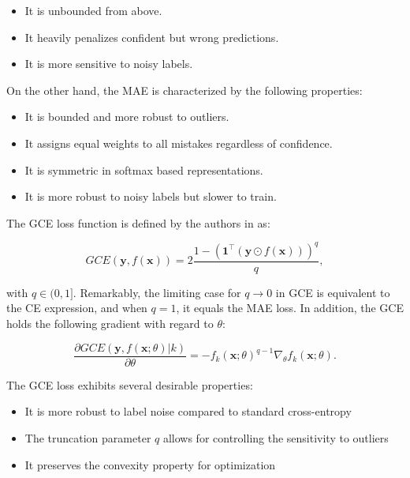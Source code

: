 \begin{itemize}
  \item It is unbounded from above.
  \item It heavily penalizes confident but wrong predictions.
  \item It is more sensitive to noisy labels.
\end{itemize}

On the other hand, the \gls{MAE} is characterized by the following properties:

\begin{itemize}
  \item It is bounded and more robust to outliers.
  \item It assigns equal weights to all mistakes regardless of confidence.
  \item It is symmetric in softmax based representations.
  \item It is more robust to noisy labels but slower to train.
\end{itemize}

The GCE loss function is defined by the authors in \cite{ZhangEtAl2018} as:

\begin{equation}
  GCE(\mathbf{y}, f(\mathbf{x})) = 2\frac{1 -
  (\mathbf{1}^\top(\mathbf{y} \odot f(\mathbf{x})))^q}{q},
\end{equation}

with $q \in (0,1]$. Remarkably, the limiting case for $q \to 0$ in
GCE is equivalent to the CE expression, and when $q = 1$, it equals
the MAE loss. In addition, the GCE holds the following gradient with
regard to $\theta$:

\begin{equation}
  \frac{\partial GCE(\mathbf{y}, f(\mathbf{x};\theta)|k)}{\partial
  \theta} = -f_k(\mathbf{x};\theta)^{q-1}\nabla_\theta f_k(\mathbf{x};\theta).
\end{equation}

The GCE loss exhibits several desirable properties:

\begin{itemize}
  \item It is more robust to label noise compared to standard cross-entropy
  \item The truncation parameter $q$ allows for controlling the
    sensitivity to outliers
  \item It preserves the convexity property for optimization
\end{itemize}

